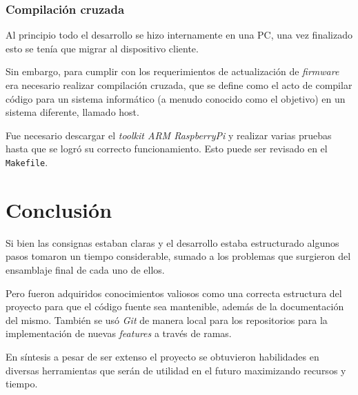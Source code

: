 \documentclass[a4paper]{article}
\begin{document}
\subsubsection{Compilación cruzada}
Al principio todo el desarrollo se hizo internamente en una PC, una vez finalizado esto se tenía que migrar al dispositivo cliente.

Sin embargo, para cumplir con los requerimientos de actualización de \textit{firmware} era necesario realizar compilación cruzada, que se define como el acto de compilar código para un sistema informático (a menudo conocido como el objetivo) en un sistema diferente, llamado host.

Fue necesario descargar el \textit{toolkit ARM RaspberryPi} y realizar varias pruebas hasta que se logró su correcto funcionamiento. Esto puede ser revisado en el \texttt{Makefile}.

\section{Conclusión}
Si bien las consignas estaban claras y el desarrollo estaba estructurado algunos pasos tomaron un tiempo considerable, sumado a los problemas que surgieron del ensamblaje final de cada uno de ellos. 

Pero fueron adquiridos conocimientos valiosos como una correcta estructura del proyecto para que el código fuente sea mantenible, además de la documentación del mismo. También se usó \textit{Git} de manera local para los repositorios para la implementación de nuevas \textit{features} a través de ramas.

En síntesis a pesar de ser extenso el proyecto se obtuvieron habilidades en diversas herramientas que serán de utilidad en el futuro maximizando recursos y tiempo.

\clearpage
%
\end{document}
